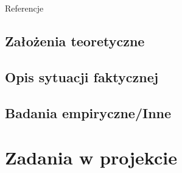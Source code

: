 \documentclass[12pt, a4paper, twoside, openany]{book}
\begin{document}
Referencje



\subsection{Założenia teoretyczne}

\subsection{Opis sytuacji faktycznej}

\subsection{Badania empiryczne/Inne}

\section{Zadania w projekcie}

\newpage
\end{document}
